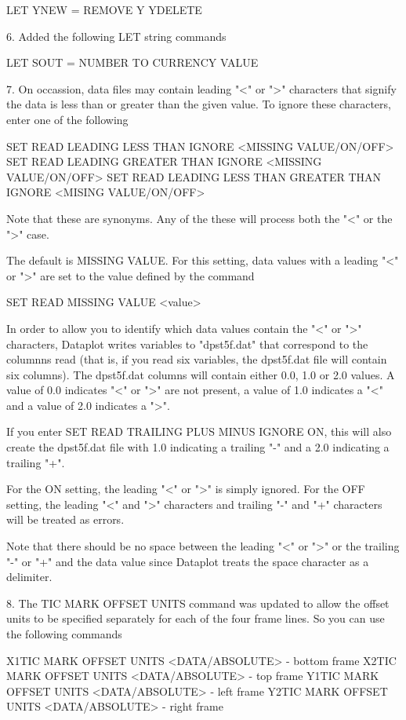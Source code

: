        LET YNEW  = REMOVE Y YDELETE

 6. Added the following LET string commands

        LET SOUT = NUMBER TO CURRENCY VALUE

 7. On occassion, data files may contain leading "<" or ">" characters
    that signify the data is less than or greater than the given value.
    To ignore these characters, enter one of the following

       SET READ LEADING LESS THAN IGNORE <MISSING VALUE/ON/OFF>
       SET READ LEADING GREATER THAN IGNORE <MISSING VALUE/ON/OFF>
       SET READ LEADING LESS THAN GREATER THAN IGNORE <MISING VALUE/ON/OFF>

    Note that these are synonyms.  Any of the these will process both the
    "<" or the ">" case.

    The default is MISSING VALUE.  For this setting, data values with a
    leading "<" or ">" are set to the value defined by the command

        SET READ MISSING VALUE <value>

    In order to allow you to identify which data values contain the "<"
    or ">" characters, Dataplot writes variables to "dpst5f.dat" that
    correspond to the columnns read (that is, if you read six variables,
    the dpst5f.dat file will contain six columns).  The dpst5f.dat columns
    will contain either 0.0, 1.0 or 2.0 values.  A value of 0.0 indicates
    "<" or ">" are not present, a value of 1.0 indicates a "<" and a value
    of 2.0 indicates a ">".

    If you enter SET READ TRAILING PLUS MINUS IGNORE ON, this will also
    create the dpst5f.dat file with 1.0 indicating a trailing "-" and
    a 2.0 indicating a trailing "+".

    For the ON setting, the leading "<" or ">" is simply ignored.  For the
    OFF setting, the leading "<" and ">" characters and trailing "-" and
    "+" characters will be treated as errors.

    Note that there should be no space between the leading "<" or ">"  or
    the trailing "-" or "+" and the data value since Dataplot treats the
    space character as a delimiter.

 8. The TIC MARK OFFSET UNITS command was updated to allow the
    offset units to be specified separately for each of the four
    frame lines.  So you can use the following commands

        X1TIC MARK OFFSET UNITS <DATA/ABSOLUTE> - bottom frame
        X2TIC MARK OFFSET UNITS <DATA/ABSOLUTE> - top frame
        Y1TIC MARK OFFSET UNITS <DATA/ABSOLUTE> - left frame
        Y2TIC MARK OFFSET UNITS <DATA/ABSOLUTE> - right frame

